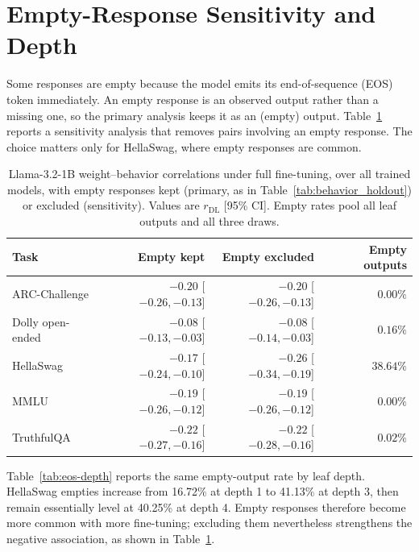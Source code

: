 \documentclass{article}
\theoremstyle{definition}
\theoremstyle{plain}
\begin{document}
\section{Empty-Response Sensitivity and Depth}
\label{app:empty-sensitivity}

Some responses are empty because the model emits its end-of-sequence (EOS) token immediately. An empty response is an observed output rather than a missing one, so the primary
analysis keeps it as an (empty) output. Table~\ref{tab:eos-sensitivity}
reports a sensitivity analysis that removes pairs involving an empty response. The choice
matters only for HellaSwag, where empty responses are common.

\begin{table}[h]
\caption{Llama-3.2-1B weight--behavior correlations under full fine-tuning, over all trained models, with empty responses kept
  (primary, as in Table~\ref{tab:behavior_holdout}) or excluded (sensitivity). Values are $r_{\mathrm{DL}}$ [95\% CI]. Empty
  rates pool all leaf outputs and all three draws.}
\label{tab:eos-sensitivity}
\centering
\small
\begin{tabular}{lrrr}
\toprule
Task & Empty kept & Empty excluded & Empty outputs \\
\midrule
ARC-Challenge & $-0.20$ [$-0.26,-0.13$] & $-0.20$ [$-0.26,-0.13$] & $0.00\%$ \\
Dolly open-ended & $-0.08$ [$-0.13,-0.03$] & $-0.08$ [$-0.14,-0.03$] & $0.16\%$ \\
HellaSwag & $-0.17$ [$-0.24,-0.10$] & $-0.26$ [$-0.34,-0.19$] & $38.64\%$ \\
MMLU & $-0.19$ [$-0.26,-0.12$] & $-0.19$ [$-0.26,-0.12$] & $0.00\%$ \\
TruthfulQA & $-0.22$ [$-0.27,-0.16$] & $-0.22$ [$-0.28,-0.16$] & $0.02\%$ \\
\bottomrule
\end{tabular}
\end{table}

Table~\ref{tab:eos-depth} reports the same empty-output rate by leaf depth. HellaSwag empties increase
from 16.72\% at depth 1 to 41.13\% at depth 3, then remain essentially level at 40.25\% at depth 4. Empty responses therefore become more common with more
fine-tuning; excluding them nevertheless strengthens the
negative association, as shown in Table~\ref{tab:eos-sensitivity}.
\end{document}
